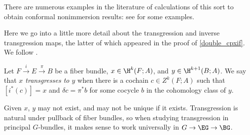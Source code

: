 %
There are numerous examples in the literature of calculations of this sort to obtain conformal nonimmersion
results: see \cite{HL74, APS2, Mil75, Don77, Tsu81, Bac82, Tsu84, Ouy94, MM01, MZ10, PT10, Li15} for some examples.
\begin{remark}
\label{transgression_detail}
Here we go into a little more detail about the transgression and inverse transgression maps, the latter of which
appeared in the proof of \cref{double_cpxif}. We follow \cites[\S 9]{Bor55}{cs}.
\begin{definition}
Let $F\overset i\to E\overset{\pi}{\to} B$ be a fiber bundle, $x\in \H^k(F; A)$, and $y\in \H^{k+1}(B; A)$. We say
that \textit{$x$ transgresses to $y$} when there is a cochain $c\in Z^k(F; A)$
such that $[i^*(c)] = x$ and $\delta c = \pi^*b$ for some cocycle $b$ in the cohomology class of $y$.
\end{definition}
Given $x$, $y$ may not exist, and may not be unique if it exists. Transgression is natural under pullback of fiber
bundles, so when studying transgression in principal $G$-bundles, it makes sense to work universally in $G\to
\EG\to\BG$.


\end{remark}
